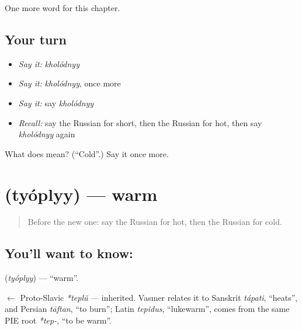 \begin{grammarlens}[title={What you've built}]
One more word for this chapter.
\end{grammarlens}

\subsection*{Your turn}
\begin{itemize}
\raggedright
  \item \emph{Say it:} \emph{kholódnyy}
  \item \emph{Say it:} \emph{kholódnyy}, once more
  \item \emph{Say it:} say \emph{kholódnyy}
  \item \emph{Recall:} say the Russian for short, then the Russian for hot, then say \emph{kholódnyy} again
\end{itemize}

\begin{tcolorbox}[breakable,colback=teal!4,colframe=teal!35!black,title={Before you move on}]
What does  mean? (\textquotedblleft{}Cold\textquotedblright{}.) Say it once more.
\end{tcolorbox}
\section[\texorpdfstring{\ru{тёплый} (tyóplyy)}{тёплый (tyóplyy)}]{ (tyóplyy) — warm}

\label{lesson:RU-C66-warm}



\begin{quote}
Before the new one: say the Russian for hot, then the Russian for cold.
\end{quote}

\subsection*{You'll want to know: }
\textbf{} (\emph{tyóplyy}) — \textquotedblleft{}warm\textquotedblright{}.

\begin{cousinweb}
\textbf{} $\leftarrow$ Proto-Slavic \emph{*teplŭ} — inherited. Vasmer relates it to Sanskrit \emph{tápati}, \textquotedblleft{}heats\textquotedblright{}, and Persian \emph{tāftan}, \textquotedblleft{}to burn\textquotedblright{}; Latin \emph{tepidus}, \textquotedblleft{}lukewarm\textquotedblright{}, comes from the same PIE root \emph{*tep-}, \textquotedblleft{}to be warm\textquotedblright{}.
\end{cousinweb}

